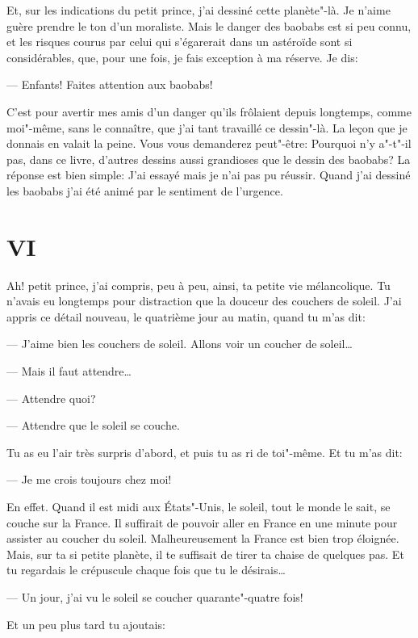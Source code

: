 \begin{Parallel}[p]{}{}
{Et, sur les indications du petit prince, j'ai dessiné
cette planète"-là. Je n'aime guère prendre le ton
d'un moraliste. Mais le danger des baobabs est si peu connu, et les risques courus par celui qui s'égarerait dans un astéroïde sont si considérables, que, pour une fois, je fais exception à ma réserve. Je dis:

--- Enfants! Faites attention aux baobabs!

C'est pour avertir mes amis d'un danger qu'ils frôlaient
depuis longtemps, comme moi"-même, sans le
connaître, que j'ai tant travaillé ce dessin"-là. La
leçon que je donnais en valait la peine. Vous vous
demanderez peut"-être: Pourquoi n'y a"-t"-il pas, dans
ce livre, d'autres dessins aussi grandioses que le dessin des baobabs? La réponse est bien simple: J'ai
essayé mais je n'ai pas pu réussir. Quand j'ai dessiné les baobabs j'ai été animé par le sentiment de l'urgence.

\section{VI}

Ah! petit prince, j'ai compris, peu à peu, ainsi, ta
petite vie mélancolique. Tu n'avais eu longtemps
pour distraction que la douceur des couchers de
soleil. J'ai appris ce détail nouveau, le quatrième
jour au matin, quand tu m'as dit:

--- J'aime bien les couchers de soleil. Allons voir un
coucher de soleil\ldots{}

--- Mais il faut attendre\ldots{}

--- Attendre quoi?

--- Attendre que le soleil se couche.

Tu as eu l'air très surpris d'abord, et puis tu as ri
de toi"-même. Et tu m'as dit:

--- Je me crois toujours chez moi!

En effet. Quand il est midi aux États"-Unis, le
soleil, tout le monde le sait, se couche sur la France.
Il suffirait de pouvoir aller en France en une minute
pour assister au coucher du soleil. Malheureusement la France est bien trop éloignée. Mais, sur ta si
petite planète, il te suffisait de tirer ta chaise de
quelques pas. Et tu regardais le crépuscule chaque
fois que tu le désirais\ldots{}

--- Un jour, j'ai vu le soleil se coucher quarante"-quatre fois!

Et un peu plus tard tu ajoutais:

}
\end{Parallel}
